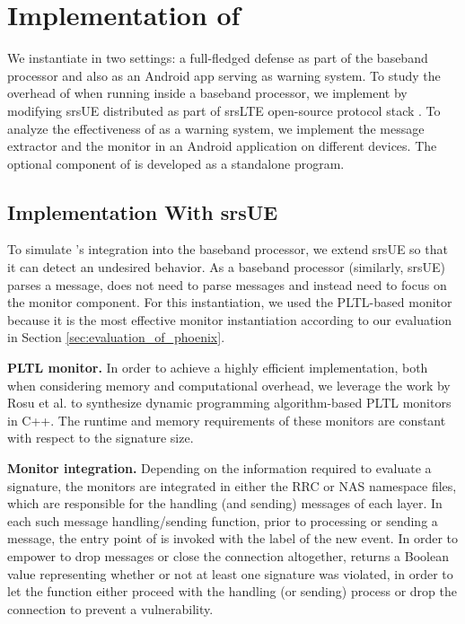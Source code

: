\section{Implementation of \system}
We instantiate \system in two settings: a full-fledged defense as part of the
baseband processor and also as an Android app serving as warning system.
To study the overhead of \system when
running inside a baseband processor, we implement \system by modifying srsUE distributed as part of
srsLTE open-source protocol stack \cite{gomez2016srslte}. To analyze the effectiveness of \system as a warning
system, we implement the message extractor and the monitor in an Android
application on different devices. The optional \signatureSynthesizer component of
\system is developed as a standalone program.

\subsection{\system Implementation With srsUE}
\label{sec:baseband_implementation}
To simulate \system{}'s integration into the baseband
processor, we extend srsUE \cite{gomez2016srslte} so that it can
detect an
undesired behavior. As a baseband processor (similarly, srsUE) parses a message,
\system does not need to parse messages
and instead need to focus on the monitor component. For this instantiation,
we used the PLTL-based monitor because it is the
most effective monitor instantiation according to our evaluation in Section \ref{sec:evaluation_of_phoenix}.

\textbf{PLTL monitor.} In order to achieve a highly efficient implementation,
both when considering memory and computational overhead, we leverage the work
by Rosu et al. \cite{rosu2001synthesizing} to synthesize dynamic programming
algorithm-based PLTL monitors in C++. The runtime and memory requirements of these
monitors are constant with respect to the signature size.

\textbf{Monitor integration.}
Depending on the information required to evaluate a signature,
the monitors are integrated in either the RRC or NAS namespace
files, which are responsible for the handling (and sending)
messages of each layer.
In each such message handling/sending function, prior to processing
or sending a message, the entry point of \system is invoked with the label of the
new event. In order to empower \system to drop messages or
close the connection altogether, \system returns a Boolean value
representing whether or not at least one signature was violated, in order
to let the function either proceed with the handling (or sending) process or drop
the connection to prevent a vulnerability.

